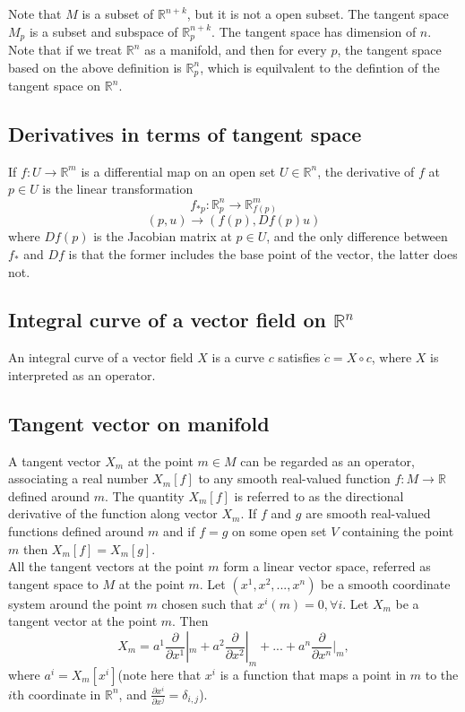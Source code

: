 \begin{refsection}
\begin{remark}
	Note that $M$ is a subset of  $\mathbb{R}^{n+k}$, but it is not a open subset. The tangent space $M_p$ is a subset and subspace of $\mathbb{R}_p^{n+k}$. The tangent space has dimension of $n$. Note that if we treat $\mathbb{R}^n$ as a manifold, and then for every $p$, the tangent space based on the above definition is $\mathbb{R}_p^{n}$, which is equilvalent to the defintion of the tangent space on $\mathbb{R}^n$.	
\end{remark}
\subsection{Derivatives in terms of tangent space}
If $f: U \rightarrow \mathbb{R}^m$ is a differential map on an open set $U \in \mathbb{R}^n$, the derivative of $f$ at $p \in U$ is the linear transformation
$$f_{*p}: \mathbb{R}_p^n \rightarrow \mathbb{R}_{f(p)}^m$$
$$(p,u) \rightarrow (f(p),Df(p)u)$$
where $Df(p)$ is the Jacobian matrix at $p\in U$, and the only difference between $f_*$ and $Df$ is that the former includes the base point of the vector, the latter does not.



\subsection{Integral curve of a vector field on $\mathbb{R}^n$}
An integral curve of a vector field $X$ is a curve $c$ satisfies $\dot{c}=X\circ c$, where $X$ is interpreted as an operator.



\subsection{Tangent vector on manifold}
A tangent vector $X_m$ at the point $m \in M$ can be regarded as an operator, associating a real number $X_m[f]$ to any smooth real-valued function $f: M\rightarrow \mathbb{R}$ defined around $m$. The quantity $X_m[f]$ is referred to as the directional derivative of the function along vector $X_m$. If $f$ and $g$ are smooth real-valued functions defined around $m$ and if $f=g$ on some open set $V$ containing the point $m$ then $X_m[f] = X_m[g]$.\\
All the tangent vectors at the point $m$ form a linear vector space, referred as tangent space to $M$ at the point $m$. Let $(x^1,x^2,...,x^n)$ be a smooth coordinate system around the point $m$ chosen such that $x^i(m) = 0, \forall i$. Let $X_m$ be a tangent vector at the point $m$. Then $$X_m = a^1 \frac{\partial}{\partial x^1}|_m + a^2 \frac{\partial}{\partial x^2}|_m + ... + a^n \frac{\partial}{\partial x^n}|_m,$$ where $a^i = X_m[x^i]$(note here that $x^i$ is a function that maps a point in $m$ to the $i$th coordinate in $\mathbb{R}^n$, and $\frac{\partial x^i}{\partial x^j} = \delta_{i,j}$).


\end{refsection}
